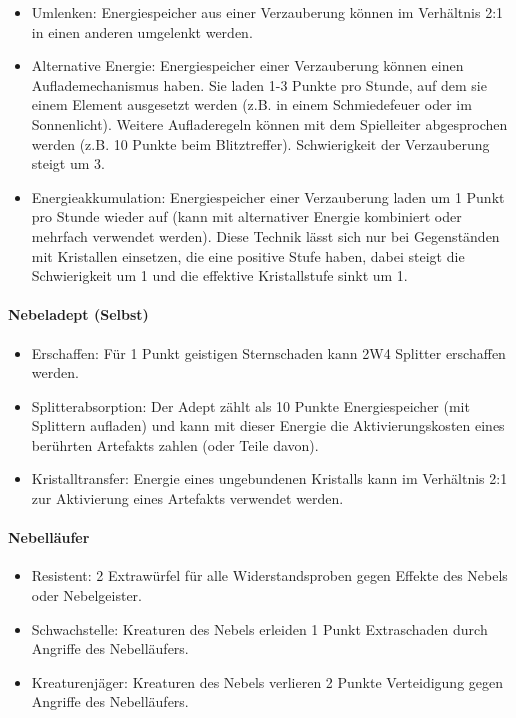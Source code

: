\documentclass{article}
\begin{document}
\begin{itemize}
\item Umlenken: Energiespeicher aus einer Verzauberung können im Verhältnis 2:1 in einen anderen umgelenkt werden.
\item Alternative Energie: Energiespeicher einer Verzauberung können einen Auflademechanismus haben. Sie laden 1-3 Punkte pro Stunde, auf dem sie einem Element ausgesetzt werden (z.B. in einem Schmiedefeuer oder im Sonnenlicht). Weitere Aufladeregeln können mit dem Spielleiter abgesprochen werden (z.B. 10 Punkte beim Blitztreffer). Schwierigkeit der Verzauberung steigt um 3.
\item Energieakkumulation: Energiespeicher einer Verzauberung laden um 1 Punkt pro Stunde wieder auf (kann mit alternativer Energie kombiniert oder mehrfach verwendet werden). Diese Technik lässt sich nur bei Gegenständen mit Kristallen einsetzen, die eine positive Stufe haben, dabei steigt die Schwierigkeit um 1 und die effektive Kristallstufe sinkt um 1.
\end{itemize}

\paragraph{Nebeladept (Selbst)}

\begin{itemize}
\item Erschaffen: Für 1 Punkt geistigen Sternschaden kann 2W4 Splitter erschaffen werden.
\item Splitterabsorption: Der Adept zählt als 10 Punkte Energiespeicher (mit Splittern aufladen) und kann mit dieser Energie die Aktivierungskosten eines berührten Artefakts zahlen (oder Teile davon).
\item Kristalltransfer: Energie eines ungebundenen Kristalls kann im Verhältnis 2:1 zur Aktivierung eines Artefakts verwendet werden.
\end{itemize}

\paragraph{Nebelläufer}

\begin{itemize}
\item Resistent: 2 Extrawürfel für alle Widerstandsproben gegen Effekte des Nebels oder Nebelgeister.
\item Schwachstelle: Kreaturen des Nebels erleiden 1 Punkt Extraschaden durch Angriffe des Nebelläufers.
\item Kreaturenjäger: Kreaturen des Nebels verlieren 2 Punkte Verteidigung gegen Angriffe des Nebelläufers.
\end{itemize}
\end{document}
